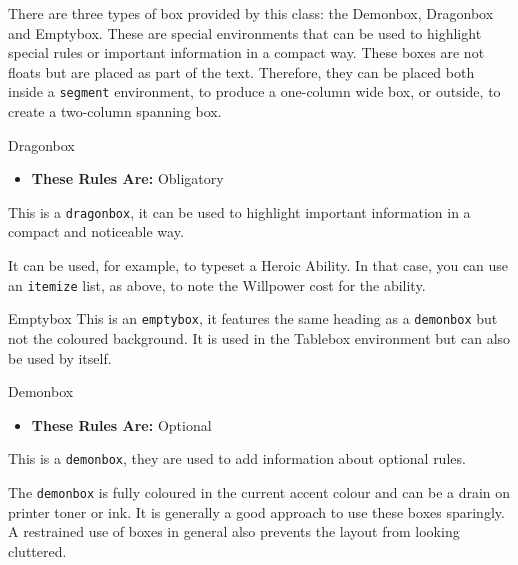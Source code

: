 \documentclass[
]{dragonbane-supplement}
\begin{document}
\begin{segment}[Boxes]

There are three types of box provided by this class: the Demonbox, Dragonbox and Emptybox. These are special environments that can be used to highlight special rules or important information in a compact way. These boxes are not floats but are placed as part of the text. Therefore, they can be placed both inside a \texttt{segment} environment, to produce a one-column wide box, or outside, to create a two-column spanning box.

\begin{dragonbox}{Dragonbox}
\begin{itemize}
    \item \textbf{These Rules Are:} Obligatory
\end{itemize}
    This is a \texttt{dragonbox}, it can be used to highlight important information in a compact and noticeable way.
    
    It can be used, for example, to typeset a Heroic Ability. In that case, you can use an \texttt{itemize} list, as above, to note the Willpower cost for the ability.
\end{dragonbox}

\begin{emptybox}{Emptybox}
    This is an \texttt{emptybox}, it features the same heading as a \texttt{demonbox} but not the coloured background. It is used in the Tablebox environment but can also be used by itself.
\end{emptybox}

\begin{demonbox}{Demonbox}
\begin{itemize}
    \item \textbf{These Rules Are:} Optional
\end{itemize}
    This is a \texttt{demonbox}, they are used to add information about optional rules.

    The \texttt{demonbox} is fully coloured in the current accent colour and can be a drain on printer toner or ink. It is generally a good approach to use these boxes sparingly. A restrained use of boxes in general also prevents the layout from looking cluttered.
\end{demonbox}
\end{segment}
\end{document}
